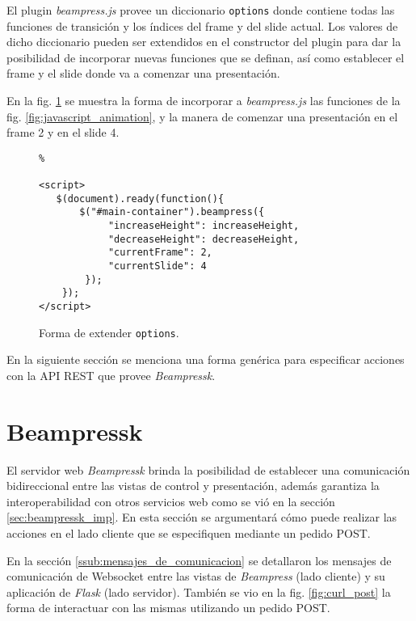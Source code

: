 		El plugin \textit{beampress.js} provee un diccionario \texttt{options} donde contiene todas las funciones de transición y los índices del frame y del slide actual. Los valores de dicho diccionario pueden ser extendidos en el constructor del plugin para dar la posibilidad de incorporar nuevas funciones que se definan, así como establecer el frame y el slide donde va a comenzar una presentación.

		En la fig. \ref{fig:extending_beampress} se muestra la forma de incorporar a \textit{beampress.js} las funciones de la fig. \ref{fig:javascript_animation}, y la manera de comenzar una presentación en el frame 2 y en el slide 4. 

		\begin{figure}[htb]%
			\begin{lstlisting}%

<script>
   $(document).ready(function(){ 
       $("#main-container").beampress({
       		"increaseHeight": increaseHeight,
       		"decreaseHeight": decreaseHeight,
       		"currentFrame": 2,
       		"currentSlide": 4
       	});
    });
</script>

			\end{lstlisting}
		\caption{Forma de extender \texttt{options}.} 
		\label{fig:extending_beampress}
		\end{figure}

		En la siguiente sección se menciona una forma genérica para especificar acciones con la API REST que provee \textit{Beampressk}. 

	\section{Beampressk} %
	\label{sec:beampressk_extended}
		El servidor web \textit{Beampressk} brinda la posibilidad de establecer una comunicación bidireccional entre las vistas de control y presentación, además garantiza la interoperabilidad con otros servicios web como se vió en la sección \ref{sec:beampressk_imp}. En esta sección se argumentará cómo puede realizar las acciones en el lado cliente que se especifiquen mediante un pedido POST.


		En la sección \ref{ssub:mensajes_de_comunicacion} se detallaron los mensajes de comunicación de Websocket entre las vistas de \textit{Beampress} (lado cliente) y su aplicación de \textit{Flask} (lado servidor). También se vio en la fig. \ref{fig:curl_post} la forma de interactuar con las mismas utilizando un pedido POST. 

